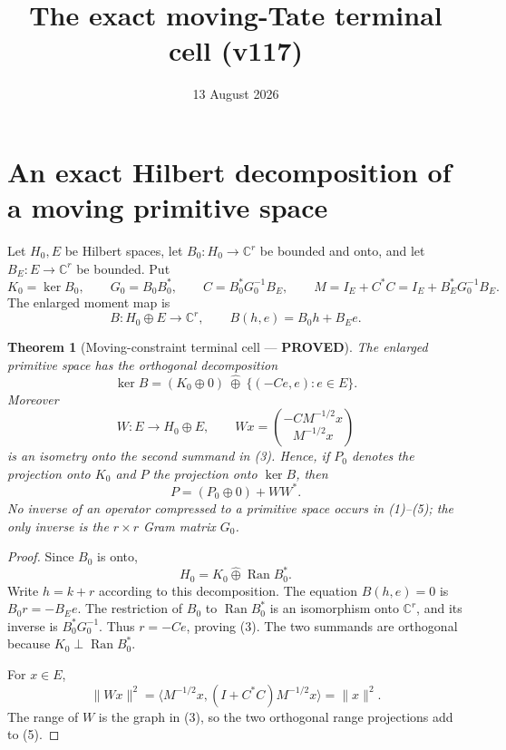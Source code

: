 \documentclass[11pt]{article}
\title{The exact moving-Tate terminal cell (v117)}
\date{13 August 2026}
\newcommand{\PROVED}{\textcolor{green!40!black}{\textbf{PROVED}}}
\newtheorem{theorem}{Theorem}
\begin{document}
\maketitle

\section{An exact Hilbert decomposition of a moving primitive space}

Let $H_0,E$ be Hilbert spaces, let $B_0:H_0\to\mathbb C^r$ be bounded
and onto, and let $B_E:E\to\mathbb C^r$ be bounded.  Put
\begin{equation}
 K_0=\ker B_0,
 \qquad G_0=B_0B_0^*,
 \qquad C=B_0^*G_0^{-1}B_E,
 \qquad M=I_E+C^*C=I_E+B_E^*G_0^{-1}B_E.                  \tag{1}
\end{equation}
The enlarged moment map is
\begin{equation}
 B:H_0\oplus E\longrightarrow\mathbb C^r,
 \qquad B(h,e)=B_0h+B_Ee.                                  \tag{2}
\end{equation}

\begin{theorem}[Moving-constraint terminal cell --- \PROVED]
The enlarged primitive space has the orthogonal decomposition
\begin{equation}
 \ker B=(K_0\oplus0)\ \widehat\oplus\
          \{(-Ce,e):e\in E\}.                              \tag{3}
\end{equation}
Moreover
\begin{equation}
 W:E\longrightarrow H_0\oplus E,
 \qquad Wx=\binom{-CM^{-1/2}x}{M^{-1/2}x}                  \tag{4}
\end{equation}
is an isometry onto the second summand in (3).  Hence, if $P_0$ denotes
the projection onto $K_0$ and $P$ the projection onto $\ker B$, then
\begin{equation}
                         P=(P_0\oplus0)+WW^*.                \tag{5}
\end{equation}
No inverse of an operator compressed to a primitive space occurs in
(1)--(5); the only inverse is the $r\times r$ Gram matrix $G_0$.
\end{theorem}

\begin{proof}
Since $B_0$ is onto,
\[
 H_0=K_0\widehat\oplus\operatorname{Ran}B_0^*.
\]
Write $h=k+r$ according to this decomposition.  The equation $B(h,e)=0$
is $B_0r=-B_Ee$.  The restriction of $B_0$ to
$\operatorname{Ran}B_0^*$ is an isomorphism onto $\mathbb C^r$, and its
inverse is $B_0^*G_0^{-1}$.  Thus $r=-Ce$, proving (3).  The two summands
are orthogonal because $K_0\perp\operatorname{Ran}B_0^*$.

For $x\in E$,
\[
 \|Wx\|^2
 =\langle M^{-1/2}x,(I+C^*C)M^{-1/2}x\rangle
 =\|x\|^2.
\]
The range of $W$ is the graph in (3), so the two orthogonal range
projections add to (5).
\end{proof}
\end{document}

